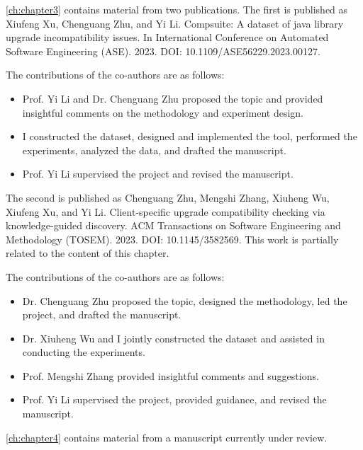 \documentclass[12pt,a4paper]{Thesis} %
\begin{document}
{
	\cref{ch:chapter3} contains material from two publications. The first is published as {\color{blue}Xiufeng Xu, Chenguang Zhu, and Yi Li. Compsuite: A dataset of java library upgrade incompatibility issues. In International Conference on Automated Software Engineering (ASE). 2023. DOI: 10.1109/ASE56229.2023.00127.}

	The contributions of the co-authors are as follows:
	\begin{itemize}[topsep=1pt,itemsep=1pt,partopsep=1pt, parsep=1pt]
		\item Prof. Yi Li and Dr. Chenguang Zhu proposed the topic and provided insightful comments on the methodology and experiment design.
		\item I constructed the dataset, designed and implemented the tool, performed the experiments, analyzed the data, and drafted the manuscript.
		\item Prof. Yi Li supervised the project and revised the manuscript.
	\end{itemize}

	The second is published as {\color{blue}Chenguang Zhu, Mengshi Zhang, Xiuheng Wu, Xiufeng Xu, and Yi Li. Client-specific upgrade compatibility checking via knowledge-guided discovery. ACM Transactions on Software Engineering and Methodology (TOSEM). 2023. DOI: 10.1145/3582569.} This work is partially related to the content of this chapter.

	The contributions of the co-authors are as follows:
	\begin{itemize}[topsep=1pt,itemsep=1pt,partopsep=1pt, parsep=1pt]
		\item Dr. Chenguang Zhu proposed the topic, designed the methodology, led the project, and drafted the manuscript.
		\item Dr. Xiuheng Wu and I jointly constructed the dataset and assisted in conducting the experiments.
		\item Prof. Mengshi Zhang provided insightful comments and suggestions.
		\item Prof. Yi Li supervised the project, provided guidance, and revised the manuscript.
	\end{itemize}

	\cref{ch:chapter4} contains material from a manuscript currently under review.
	
}
\end{document}
